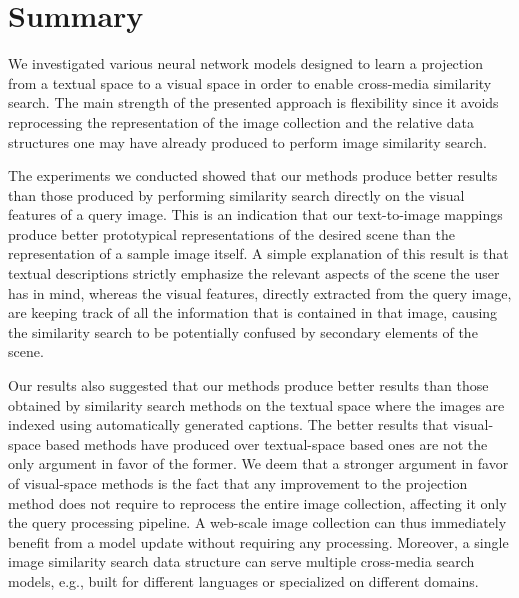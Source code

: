 \section{Summary}
\label{sec:t2v:conclusions}

We investigated various neural network models designed to learn a projection from a textual space to a visual space in order to enable cross-media similarity search.
The main strength of the presented approach is flexibility since it avoids reprocessing the representation of the image collection and the relative data structures one may have already produced to perform image similarity search.

The experiments we conducted showed that our methods produce better results than those produced by performing similarity search directly on the visual features of a query image.
This is an indication that our text-to-image mappings produce better prototypical representations of the desired scene than the representation of a sample image itself.
A simple explanation of this result is that textual descriptions strictly emphasize the relevant aspects of the scene the user has in mind, whereas the visual features, directly extracted from the query image, are keeping track of all the information that is contained in that image, causing the similarity search to be potentially confused by secondary elements of the scene.

Our results also suggested that our methods produce better results than those obtained by similarity search methods on the textual space where the images are indexed using automatically generated captions.
The better results that visual-space based methods have produced over textual-space based ones are not the only argument in favor of the former.
We deem that a stronger argument in favor of visual-space methods is the fact that any improvement to the projection method does not require to reprocess the entire image collection, affecting it only the query processing pipeline.
A web-scale image collection can thus immediately benefit from a model update without requiring any processing.
Moreover, a single image similarity search data structure can serve multiple cross-media search models, e.g., built for different languages or specialized on different domains.

